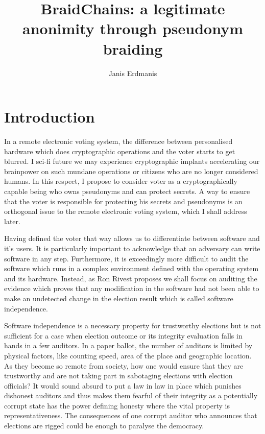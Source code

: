 \documentclass[12pt]{article}
\begin{document}

\title{BraidChains: a legitimate anonimity through pseudonym braiding} %
\author{Janis Erdmanis} %

\maketitle


\section*{Introduction}

In a remote electronic voting system, the difference between personalised hardware which does cryptographic operations and the voter starts to get blurred. I sci-fi future we may experience cryptographic implants accelerating our brainpower on such mundane operations or citizens who are no longer considered humans. In this respect, I propose to consider voter as a cryptographically capable being who owns pseudonyms and can protect secrets. A way to ensure that the voter is responsible for protecting his secrets and pseudonyms is an orthogonal issue to the remote electronic voting system, which I shall address later.

Having defined the voter that way allows us to differentiate between software and it's users. It is particularly important to acknowledge that an adversary can write software in any step. Furthermore, it is exceedingly more difficult to audit the software which runs in a complex environment defined with the operating system and its hardware. Instead, as Ron Rivest proposes we shall focus on auditing the evidence which proves that any modification in the software had not been able to make an undetected change in the election result which is called software independence.

Software independence is a necessary property for trustworthy elections but is not sufficient for a case when election outcome or its integrity evaluation falls in hands in a few auditors. In a paper ballot, the number of auditors is limited by physical factors, like counting speed, area of the place and geographic location. As they become so remote from society, how one would ensure that they are trustworthy and are not taking part in sabotaging elections with election officials? It would sound absurd to put a law in law in place which punishes dishonest auditors and thus makes them fearful of their integrity as a potentially corrupt state has the power defining honesty where the vital property is representativeness. The consequences of one corrupt auditor who announces that elections are rigged could be enough to paralyse the democracy.
\end{document}
